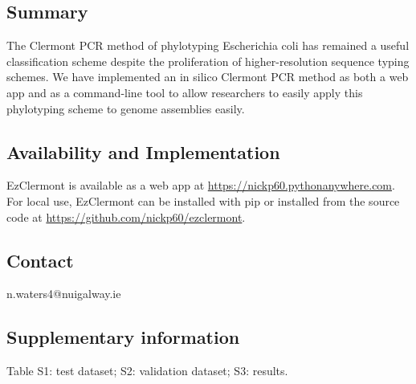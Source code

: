 
\subsection*{Summary}
The Clermont PCR method of phylotyping Escherichia coli has remained a useful classification scheme despite the proliferation of higher-resolution sequence typing schemes.  We have implemented an in silico Clermont PCR method as both a web app and as a command-line tool to allow researchers to easily apply this phylotyping scheme to genome assemblies easily.
\subsection*{Availability and Implementation}
EzClermont is available as a web app at  \url{https://nickp60.pythonanywhere.com}.  For local use, EzClermont can be installed with pip or installed from the source code at \url{https://github.com/nickp60/ezclermont}.
\subsection*{Contact}
n.waters4@nuigalway.ie
\subsection*{Supplementary information}
Table S1: test dataset; S2: validation dataset; S3: results.
